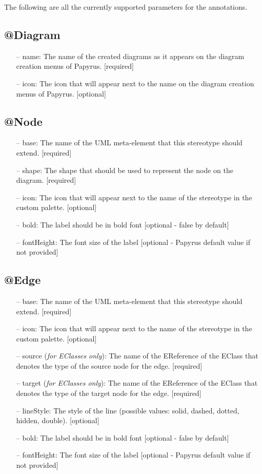 The following are all the currently supported parameters for the annotations.

\subsection{@Diagram}
\begin{itemize}
	\item[--] name: The name of the created diagrams as it appears on the diagram creation menus of Papyrus. [required]
	\item[--] icon: The icon that will appear next to the name on the diagram creation menus of Papyrus. [optional]
\end{itemize}

\subsection{@Node}
\begin{itemize}
	\item[--] base: The name of the UML meta-element that this stereotype should extend. [required]
	\item[--] shape: The shape that should be used to represent the node on the diagram. [required]		
	\item[--] icon: The icon that will appear next to the name of the stereotype in the custom palette. [optional]
	\item[--] bold: The label should be in bold font [optional - false by default]		
	\item[--] fontHeight: The font size of the label [optional - Papyrus default value if not provided]
\end{itemize}

\subsection{@Edge}
\begin{itemize}
	\item[--] base: The name of the UML meta-element that this stereotype should extend. [required]
	\item[--] icon: The icon that will appear next to the name of the stereotype in the custom palette. [optional]
	\item[--] source (\textit{for EClasses only}): The name of the EReference of the EClass that denotes the type of the source node for the edge. [required]
	\item[--] target (\textit{for EClasses only}): The name of the EReference of the EClass that denotes the type of the target node for the edge. [required]
	\item[--] lineStyle: The style of the line (possible values: solid, dashed, dotted, hidden, double). [optional]
	\item[--] bold: The label should be in bold font [optional - false by default]		
	\item[--] fontHeight: The font size of the label [optional - Papyrus default value if not provided]
\end{itemize}